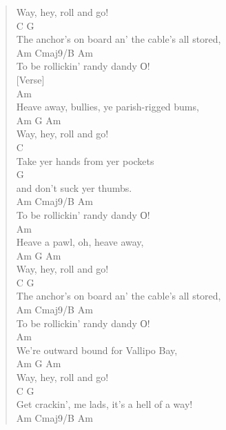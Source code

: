 \documentclass[11pt]{article}
\begin{document}
\begin{verse}
Way, hey, roll and go!\\
\hspace*{4em}C                         G\\
The anchor's on board an' the cable's all stored,\\
\hspace*{8em}Am              Cmaj9/B  Am\\
To be rollickin' randy dandy О!\\
\vspace*{1em}
[Verse]\\
Am\\
Heave away, bullies, ye parish-rigged bums,\\
Am   G    Am\\
Way, hey, roll and go!\\
\hspace*{9em}C\\
Take yer hands from yer pockets\\
\hspace*{4em}G\\
and don't suck yer thumbs.\\
\hspace*{8em}Am              Cmaj9/B  Am\\
To be rollickin' randy dandy О!\\
\vspace*{1em}
Am\\
Heave a pawl, oh, heave away,\\
Am   G    Am\\
Way, hey, roll and go!\\
\hspace*{4em}C                         G\\
The anchor's on board an' the cable's all stored,\\
\hspace*{8em}Am              Cmaj9/B  Am\\
To be rollickin' randy dandy О!\\
\vspace*{1em}
Am\\
We're outward bound for Vallipo Bay,\\
Am   G    Am\\
Way, hey, roll and go!\\
\hspace*{4em}C                         G\\
Get crackin', me lads, it's a hell of a way!\\
\hspace*{8em}Am              Cmaj9/B  Am\\

\end{verse}
\end{document}
